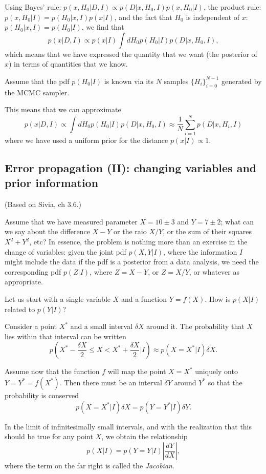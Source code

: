 \documentclass[%
oneside,                 %
final,                   %
10pt]{article}
\begin{document}
Using Bayes' rule: $p(x,H_0|D,I) \propto p(D|x,H_0,I) p(x,H_0|I)$, the product rule: $p(x,H_0|I) = p(H_0|x,I)p(x|I)$, and the fact that $H_0$ is independent of $x$: $p(H_0|x,I) = p(H_0|I)$, we find that
\[
p(x|D,I) \propto p(x|I) \int dH_0 p(H_0|I) p(D|x,H_0,I),
\]
which means that we have expressed the quantity that we want (the posterior of $x$) in terms of quantities that we know.

Assume that the pdf $p(H_0 | I)$ is known via its $N$ samples $\{H_{i}\}_{i=0}^{N-1}$ generated by the MCMC sampler.

This means that we can approximate 
\[
p(x |D,I) \propto \int dH_0 p(H_0|I) p(D|x,H_0,I) \approx \frac{1}{N} \sum_{i=1}^N p(D | x, H_i, I)
\]
where we have used a uniform prior for the distance $p(x|I) \propto 1$.


\subsection{Error propagation (II): changing variables and prior information}
(Based on Sivia, ch 3.6.)

Assume that we have measured parameter $X = 10 \pm 3$ and $Y=7 \pm 2$; what can we say about the difference $X-Y$ or the raio $X/Y$, or the sum of their squares $X^2+Y^2$, etc? In essence, the problem is nothing more than an exercise in the change of variables: given the joint pdf $p(X,Y|I)$, where the information $I$ might include the data if the pdf is a posterior from a data analysis, we need the corresponding pdf $p(Z|I)$, where $Z=X-Y$, or $Z=X/Y$, or whatever as appropriate.

Let us start with a single variable $X$ and a function $Y=f(X)$. How is $p(X|I)$ related to $p(Y|I)$?

Consider a point $X^*$ and a small interval $\delta X$ around it. The probability that $X$ lies within that interval can be written
\[
p \left( X^* - \frac{\delta X}{2} \le X < X^* + \frac{\delta X}{2} \big| I \right) 
\approx p(X=X^*|I) \delta X.
\]

Assume now that the function $f$ will map the point $X=X^*$ uniquely onto $Y=Y^*=f(X^*)$. Then there must be an interval $\delta Y$ around $Y^*$ so that the probability is conserved
\[
p(X=X^*|I) \delta X = p(Y=Y^*|I) \delta Y.
\]

In the limit of infinitesimally small intervals, and with the realization that this should be true for any point $X$, we obtain the relationship
\begin{equation}
p(X|I) = p(Y=Y|I) \left| \frac{dY}{dX} \right|,
\label{eq:transformation}
\end{equation}
where the term on the far right is called the \emph{Jacobian}.
\end{document}
